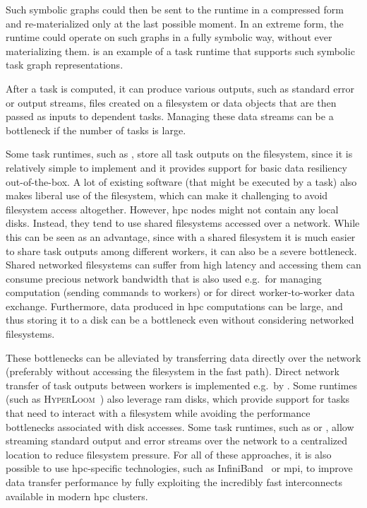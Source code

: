 \begin{description}[wide=0pt]
		Such symbolic graphs could then be sent to the runtime in a compressed form and re-materialized
		only at the last possible moment. In an extreme form, the runtime could operate on such graphs in a
		fully symbolic way, without ever materializing them. \dask{} is an example of a task
		runtime that supports such symbolic task graph representations.
	\item[Data transfers] After a task is computed, it can produce various outputs, such as standard error or output streams,
		files created on a filesystem or data objects that are then passed as inputs to dependent tasks.
		Managing these data streams can be a bottleneck if the number of tasks is large.

		Some task runtimes, such as \snakemake{}, store all task outputs on the filesystem, since
		it is relatively simple to implement and it provides support for basic data resiliency
		out-of-the-box. A lot of existing software (that might be executed by a task) also makes liberal
		use of the filesystem, which can make it challenging to avoid filesystem access altogether.
		However, \gls{hpc} nodes might not contain any local disks. Instead, they tend to use
		shared filesystems accessed over a network. While this can be seen as an advantage, since with a
		shared filesystem it is much easier to share task outputs among different workers, it can also be a
		severe bottleneck. Shared networked filesystems can suffer from high latency and accessing them can
		consume precious network bandwidth that is also used e.g.\ for managing computation (sending
		commands to workers) or for direct worker-to-worker data exchange. Furthermore, data produced in
		\gls{hpc} computations can be large, and thus storing it to a disk can be a bottleneck
		even without considering networked filesystems.

		These bottlenecks can be alleviated by transferring data directly over the network (preferably
		without accessing the filesystem in the fast path). Direct network transfer of task outputs between
		workers is implemented e.g.\ by \dask{}. Some runtimes (such as
		\textsc{HyperLoom}~\cite{hyperloom}) also leverage \gls{ram} disks, which
		provide support for tasks that need to interact with a filesystem while avoiding the performance
		bottlenecks associated with disk accesses. Some task runtimes, such as \hypershell{} or
		\pegasus{}, allow streaming standard output and error streams over the network to a
		centralized location to reduce filesystem pressure. For all of these approaches, it is also
		possible to use \gls{hpc}-specific technologies, such as
		InfiniBand~\cite{infiniband} or \gls{mpi}, to improve data transfer performance
		by fully exploiting the incredibly fast interconnects available in modern \gls{hpc}
		clusters.
\end{description}

